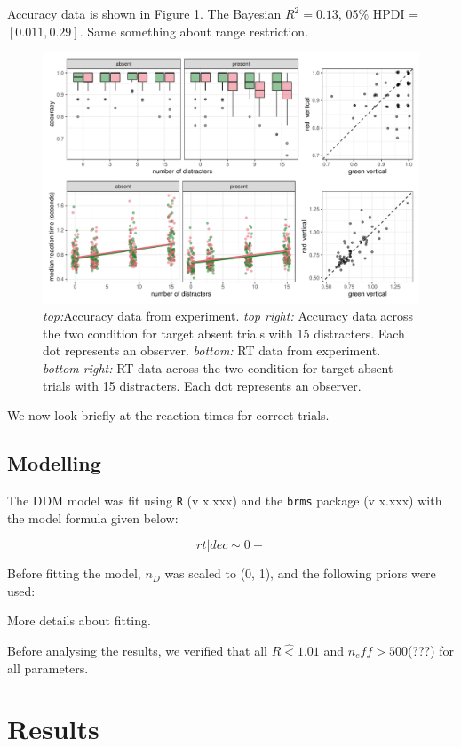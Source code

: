 \documentclass[11pt, twoside, twocolumn]{article}
\begin{document}
Accuracy data is shown in Figure \ref{fig:lvl3_emp}. The Bayesian $R^2 = 0.13$, 05\% HPDI = $[0.011, 0.29]$. Same something about range restriction.

\begin{figure}
\centering
\includegraphics[width=\linewidth]{figs/exp_lvl_3_emp.pdf}
\caption{\textit{top:}Accuracy data from experiment. \textit{top right:} Accuracy data across the two condition for target absent trials with 15 distracters. Each dot represents an observer. \textit{bottom:} RT data from experiment. \textit{bottom right:} RT data across the two condition for target absent trials with 15 distracters. Each dot represents an observer.}
\label{fig:lvl3_emp}
\end{figure}

We now look briefly at the reaction times for correct trials. 

\subsection{Modelling}


The DDM model was fit using \texttt{R} (v x.xxx) and the \texttt{brms} package (v x.xxx) with the model formula given below:

$$rt | dec \sim 0 + $$

Before fitting the model, $n_D$ was scaled to (0, 1), and the following priors were used:

More details about fitting. 

Before analysing the results, we verified that all $R\hat < 1.01$ and $n_eff>500$(???) for all parameters. 

\section{Results}
\end{document}
